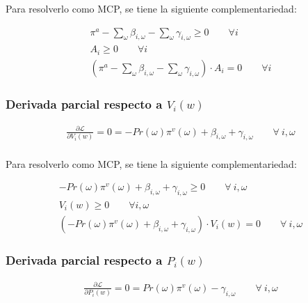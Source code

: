 Para resolverlo como MCP, se tiene la siguiente complementariedad:
\begin{footnotesize}
\begin{align}
    \pi^{a} - \sum_{\omega}\beta_{i,\omega} - \sum_{\omega}\gamma_{i,\omega} \geq 0 \qquad \forall  i\\
    A_i \geq 0 \qquad \forall  i\\
    (\pi^{a} - \sum_{\omega}\beta_{i,\omega} - \sum_{\omega}\gamma_{i,\omega}) \cdot A_i = 0 \qquad \forall  i
\end{align}

\end{footnotesize}


\subsubsection{Derivada parcial respecto a $V_i(w)$}
\begin{footnotesize}
\begin{align}
   \frac{\partial \mathcal{L} }{\partial V_i(w)}= 0
   = -Pr(\omega) \pi^v(\omega) + \beta_{i,\omega}  + \gamma_{i,\omega}  \qquad \forall \  i, \omega \\
\end{align}

\end{footnotesize}


Para resolverlo como MCP, se tiene la siguiente complementariedad:
\begin{footnotesize}
\begin{align}
    -Pr(\omega) \pi^v(\omega) + \beta_{i,\omega}  + \gamma_{i,\omega} \geq 0 \qquad \forall \  i, \omega \\
    V_i(w) \geq 0 \qquad \forall  i,\omega \\
    (-Pr(\omega) \pi^v(\omega) + \beta_{i,\omega}  + \gamma_{i,\omega}) \cdot  V_i(w) = 0  \qquad \forall \  i, \omega 
\end{align}

\end{footnotesize}


\subsubsection{Derivada parcial respecto a $P_i(w)$}
\begin{footnotesize}
\begin{align}
   \frac{\partial \mathcal{L} }{\partial P_i(w)}= 0
   = Pr(\omega) \pi^v(\omega) -\gamma_{i,\omega} \qquad \forall \  i, \omega \\
\end{align}

\end{footnotesize}


